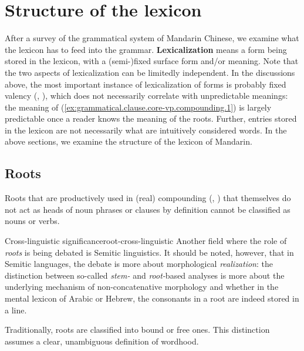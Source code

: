 \documentclass[UTF8, a4paper, oneside, scheme=plain, 12pt]{ctexrep}
\newcommand*{\concept}[1]{\textbf{#1}}
\newcommand*{\term}[1]{\emph{#1}}
\begin{document}
\section{Structure of the lexicon}\label{sec:grammatical.lexicon}

After a survey of the grammatical system of Mandarin Chinese,
we examine what the lexicon has to feed into the grammar.
\concept{Lexicalization} means a form being stored in the lexicon,
with a (semi-)fixed surface form and/or meaning.
Note that the two aspects of lexicalization can be limitedly independent.
In the discussions above, the most important instance of lexicalization of forms
is probably fixed valency
(, ),
which does not necessarily correlate with unpredictable meanings:
the meaning of (\ref{ex:grammatical.clause.core-vp.compounding.1}) is largely predictable
once a reader knows the meaning of the roots.
Further, entries stored in the lexicon are not necessarily what are intuitively considered words.
In the above sections, we examine the structure of the lexicon of Mandarin.

\subsection{Roots}\label{sec:grammatical.lexicon.roots}

Roots that are productively used in (real) compounding 
(,
)
that themselves do not act as heads of noun phrases or clauses
by definition cannot be classified as nouns or verbs.

\begin{infobox}{Cross-linguistic significance}{root-cross-linguistic}
    Another field where the role of \term{roots} is being debated is Semitic linguistics.
    It should be noted, however, that in Semitic languages,
    the debate is more about morphological \term{realization}:
    the distinction between so-called \term{stem-} and \term{root-}based analyses
    is more about the underlying mechanism of non-concatenative morphology
    and whether in the mental lexicon of Arabic or Hebrew,
    the consonants in a root are indeed stored in a line.
\end{infobox}

Traditionally, roots are classified into bound or free ones.
This distinction assumes a clear, unambiguous definition of wordhood.
\end{document}
